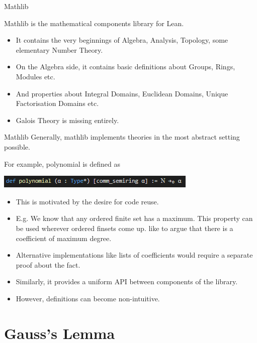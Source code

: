 \documentclass{beamer}
\begin{document}
\begin{frame}{Mathlib}

  Mathlib is the mathematical components library for Lean. 
  \begin{itemize}
    \item It contains the very beginnings of Algebra, Analysis, Topology, some elementary Number Theory. 
    \item On the Algebra side, it contains basic definitions about Groups, Rings, Modules etc. 
    \item And properties about Integral Domains, Euclidean Domains, Unique Factorisation Domains etc. 
    \item Galois Theory is missing entirely.  
  \end{itemize}


\end{frame}

\begin{frame}{Mathlib}
  Generally, mathlib implements theories in the most abstract setting possible. 

  For example, polynomial is defined as

  \includegraphics{polynomial.png}

  \begin{itemize}
    \item  This is motivated by the desire for code reuse. 
    \item E.g. We know that any ordered finite set has a maximum. This property can be used wherever ordered finsets come up. 
          like to argue that there is a coefficient of maximum degree. 
    \item Alternative implementations like lists of coefficients would require a separate proof about the fact. 
    \item Similarly, it provides a uniform API between components of the library. 
    \item However, definitions can become non-intuitive.
  \end{itemize}
\end{frame}

\section {Gauss's Lemma}
\end{document}
